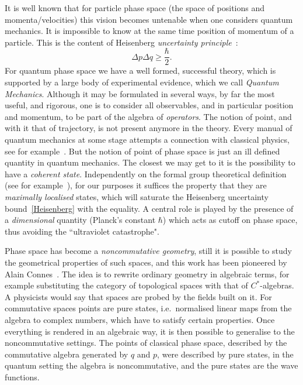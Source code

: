 \documentclass[12pt,a4paper]{article}
\newcommand{\be}{\begin{equation}}
\newcommand{\ee}{\end{equation}}
\begin{document}
It is well known that for particle phase space (the space of positions and momenta/velocities) this vision becomes untenable when one considers quantum mechanics. It is impossible to know at the same time position of momentum of a particle. This is the content of Heisenberg \emph{uncertainty principle}~\cite{Heisenberguncert}:
\be
\Delta p \Delta q \geq \frac\hbar2 . \label{Heisenberg}
\ee
For quantum phase space we have a well formed, successful theory, which is supported by a large body of experimental evidence, which we call \emph{Quantum Mechanics}. Although it may be formulated in several ways, by far the most useful, and rigorous, one is to consider all observables, and in particular position and momentum, to be part of the algebra of \emph{operators}. The notion of point, and with it that of trajectory, is not present anymore in the theory. Every manual of quantum mechanics at some stage attempts a connection with classical physics, see for example~\cite[Sect.~II.4]{Messiah}. But the notion of point of phase space is just  an ill defined quantity in quantum mechanics. The closest we may get to it is the possibility to have a \emph{coherent state}. Independently on the formal group theoretical definition (see for example~\cite{Perelomov}), for our purposes it suffices the property that they are \emph{maximally localised} states, which will saturate the Heisenberg uncertainty bound~\eqref{Heisenberg} with the equality. A central role is played by the presence of a \emph{dimensional} quantity (Planck's constant $\hbar$) which acts as cutoff on phase space, thus avoiding the ``ultraviolet catastrophe".

Phase space has become a \emph{noncommutative geometry}, still it is possible to study the geometrical properties of such spaces, and this work has been pioneered by Alain Connes~\cite{Connesbook}. The idea is to rewrite ordinary geometry in algebraic terms, for example substituting the category of topological spaces with that of $C^*$-algebras. A physicists would say that spaces are probed by the fields built on it. For commutative spaces points are pure states, i.e.\ normalised linear maps from the algebra to complex numbers, which have to satisfy certain properties. Once everything is rendered in an algebraic way, it is then possible to generalise to the noncommutative settings. The points of classical phase space, described by the commutative algebra generated by $q$ and $p$, were described by pure states, in the quantum setting the algebra is noncommutative, and the pure states are the wave functions. 
\end{document}
